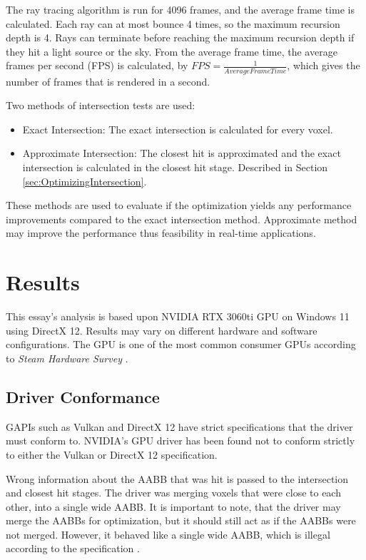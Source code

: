 \documentclass[12pt]{article}
\begin{document}
The ray tracing algorithm is run for 4096 frames, and the average frame time is calculated.
Each ray can at most bounce 4 times, so the maximum recursion depth is 4.
Rays can terminate before reaching the maximum recursion depth if they hit a light source or the sky.
From the average frame time, the average frames per second (FPS) is calculated, by $FPS = \frac{1}{Average Frame Time}$,
which gives the number of frames that is rendered in a second.

Two methods of intersection tests are used:
\begin{itemize}
    \itemsep0em
    \item Exact Intersection: The exact intersection is calculated for every voxel.
    \item Approximate Intersection: The closest hit is approximated and the exact intersection is calculated in the closest hit stage.
          Described in Section \ref{sec:OptimizingIntersection}.
\end{itemize}

These methods are used to evaluate if the optimization yields any performance improvements compared to the exact intersection method.
Approximate method may improve the performance thus feasibility in real-time applications.

\section{Results}

This essay's analysis is based upon NVIDIA RTX 3060ti GPU on Windows 11 using DirectX 12.
Results may vary on different hardware and software configurations.
The GPU is one of the most common consumer GPUs according to {\it Steam Hardware Survey} \cite{Steam:HardwareSurvey}.

\subsection{Driver Conformance}

GAPIs such as Vulkan and DirectX 12 have strict specifications that the driver must conform to.
NVIDIA's GPU driver has been found not to conform strictly to either the Vulkan or DirectX 12 specification.

Wrong information about the AABB that was hit is passed to the intersection and closest hit stages.
The driver was merging voxels that were close to each other, into a single wide AABB.
It is important to note, that the driver may merge the AABBs for optimization, but it should still act as if the AABBs were not merged.
However, it behaved like a single wide AABB, which is illegal according to the specification \parencite{DirectX:Specification}.
\end{document}
